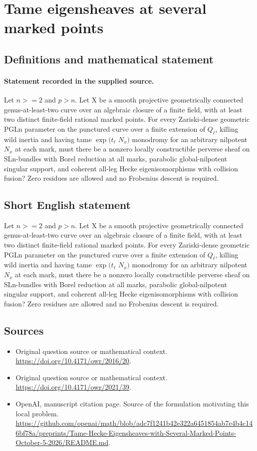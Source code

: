 \documentclass[11pt]{article}
\begin{document}
\section*{Tame eigensheaves at several marked points}\label{statement}
\subsection{Definitions and mathematical statement}
\paragraph{Statement recorded in the supplied source.}
Let $n>=2$ and $p>n$. Let X be a smooth projective geometrically connected genus-at-least-two curve over an algebraic closure of a finite field, with at least two distinct finite-field rational marked points. For every Zariski-dense geometric PGLn parameter on the punctured curve over a finite extension of $Q_\ell $, killing wild inertia and having tame $\exp (t_\ell $ $N_x)$ monodromy for an arbitrary nilpotent $N_x$ at each mark, must there be a nonzero locally constructible perverse sheaf on SLn-bundles with Borel reduction at all marks, parabolic global-nilpotent singular support, and coherent all-leg Hecke eigenisomorphisms with collision fusion? Zero residues are allowed and no Frobenius descent is required.
\subsection{Short English statement}
Let $n>=2$ and $p>n$. Let X be a smooth projective geometrically connected genus-at-least-two curve over an algebraic closure of a finite field, with at least two distinct finite-field rational marked points. For every Zariski-dense geometric PGLn parameter on the punctured curve over a finite extension of $Q_\ell $, killing wild inertia and having tame $\exp (t_\ell $ $N_x)$ monodromy for an arbitrary nilpotent $N_x$ at each mark, must there be a nonzero locally constructible perverse sheaf on SLn-bundles with Borel reduction at all marks, parabolic global-nilpotent singular support, and coherent all-leg Hecke eigenisomorphisms with collision fusion? Zero residues are allowed and no Frobenius descent is required.
\subsection{Sources}
\begin{itemize}
\item[S1] Original question source or mathematical context.
\url{https://doi.org/10.4171/owr/2016/20}.
\item[S2] Original question source or mathematical context.
\url{https://doi.org/10.4171/owr/2021/39}.
\item[S3] OpenAI, manuscript citation page. Source of the formulation motivating this local problem.
\url{https://github.com/openai/math/blob/adc7f1241b42e322a6451854ab7e4b4c146bf78a/preprints/Tame-Hecke-Eigensheaves-with-Several-Marked-Points-October-5-2026/README.md}.
\end{itemize}
\end{document}
